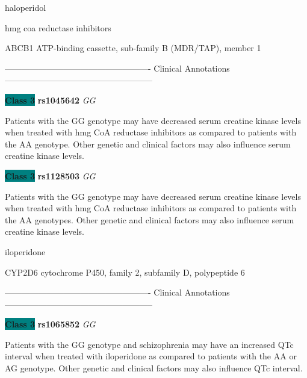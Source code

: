 \documentclass{resume} %
\begin{document}
\begin{rSection}{ haloperidol }
\end{rSection}\begin{rSection}{ hmg coa reductase inhibitors }
\item[]

\begin{rSubsection}{ ABCB1 }{ ATP-binding cassette, sub-family B (MDR/TAP), member 1 }{}{}
\item[]

\item[] ---------------------------------------------------- Clinical Annotations -----------------------------------------------------\newline
\item \textbf{\colorbox{teal} {Class 3}} \textbf{ rs1045642 } \textit{ GG }
\item[] Patients with the GG genotype may have decreased serum creatine kinase levels when treated with hmg CoA reductase inhibitors as compared to patients with the AA genotype. Other genetic and clinical factors may also influence serum creatine kinase levels. \item \textbf{\colorbox{teal} {Class 3}} \textbf{ rs1128503 } \textit{ GG }
\item[] Patients with the GG genotype may have decreased serum creatine kinase levels when treated with hmg CoA reductase inhibitors as compared to patients with the AA genotypes. Other genetic and clinical factors may also influence serum creatine kinase levels. 
\end{rSubsection}

\end{rSection}\begin{rSection}{ iloperidone }
\item[]

\begin{rSubsection}{ CYP2D6 }{ cytochrome P450, family 2, subfamily D, polypeptide 6 }{}{}
\item[]

\item[] ---------------------------------------------------- Clinical Annotations -----------------------------------------------------\newline
\item \textbf{\colorbox{teal} {Class 3}} \textbf{ rs1065852 } \textit{ GG }
\item[] Patients with the GG genotype and schizophrenia may have an increased QTc interval when treated with iloperidone as compared to patients with the AA or AG genotype. Other genetic and clinical factors may also influence QTc interval.
\end{rSubsection}


\end{rSection}
\end{document}
